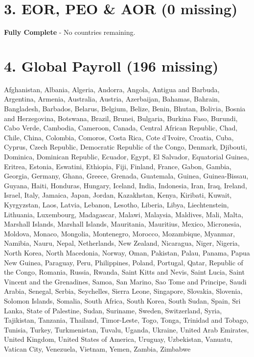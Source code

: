 \documentclass{article}
\begin{document}
\section*{3. EOR, PEO \& AOR (0 missing)}
\noindent \textbf{Fully Complete} - No countries remaining.

\section*{4. Global Payroll (196 missing)}
Afghanistan, Albania, Algeria, Andorra, Angola, Antigua and Barbuda, Argentina, Armenia, Australia, Austria, Azerbaijan, Bahamas, Bahrain, Bangladesh, Barbados, Belarus, Belgium, Belize, Benin, Bhutan, Bolivia, Bosnia and Herzegovina, Botswana, Brazil, Brunei, Bulgaria, Burkina Faso, Burundi, Cabo Verde, Cambodia, Cameroon, Canada, Central African Republic, Chad, Chile, China, Colombia, Comoros, Costa Rica, Cote d'Ivoire, Croatia, Cuba, Cyprus, Czech Republic, Democratic Republic of the Congo, Denmark, Djibouti, Dominica, Dominican Republic, Ecuador, Egypt, El Salvador, Equatorial Guinea, Eritrea, Estonia, Eswatini, Ethiopia, Fiji, Finland, France, Gabon, Gambia, Georgia, Germany, Ghana, Greece, Grenada, Guatemala, Guinea, Guinea-Bissau, Guyana, Haiti, Honduras, Hungary, Iceland, India, Indonesia, Iran, Iraq, Ireland, Israel, Italy, Jamaica, Japan, Jordan, Kazakhstan, Kenya, Kiribati, Kuwait, Kyrgyzstan, Laos, Latvia, Lebanon, Lesotho, Liberia, Libya, Liechtenstein, Lithuania, Luxembourg, Madagascar, Malawi, Malaysia, Maldives, Mali, Malta, Marshall Islands, Marshall Islands, Mauritania, Mauritius, Mexico, Micronesia, Moldova, Monaco, Mongolia, Montenegro, Morocco, Mozambique, Myanmar, Namibia, Nauru, Nepal, Netherlands, New Zealand, Nicaragua, Niger, Nigeria, North Korea, North Macedonia, Norway, Oman, Pakistan, Palau, Panama, Papua New Guinea, Paraguay, Peru, Philippines, Poland, Portugal, Qatar, Republic of the Congo, Romania, Russia, Rwanda, Saint Kitts and Nevis, Saint Lucia, Saint Vincent and the Grenadines, Samoa, San Marino, Sao Tome and Principe, Saudi Arabia, Senegal, Serbia, Seychelles, Sierra Leone, Singapore, Slovakia, Slovenia, Solomon Islands, Somalia, South Africa, South Korea, South Sudan, Spain, Sri Lanka, State of Palestine, Sudan, Suriname, Sweden, Switzerland, Syria, Tajikistan, Tanzania, Thailand, Timor-Leste, Togo, Tonga, Trinidad and Tobago, Tunisia, Turkey, Turkmenistan, Tuvalu, Uganda, Ukraine, United Arab Emirates, United Kingdom, United States of America, Uruguay, Uzbekistan, Vanuatu, Vatican City, Venezuela, Vietnam, Yemen, Zambia, Zimbabwe
\end{document}
